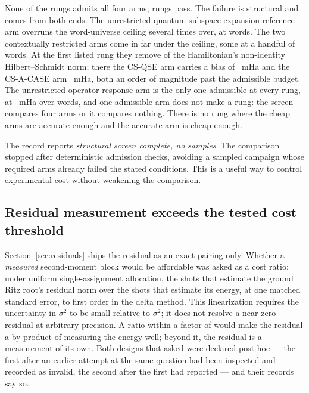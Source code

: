 \documentclass[aps,pra,reprint,superscriptaddress,nofootinbib,floatfix,
  showkeys]{revtex4-2}
\begin{document}
None of the \cqcRFourARungs{} rungs admits all four arms; \cqcRFourAPassing{}
rungs pass.  The failure is structural and comes from both ends.  The
unrestricted quantum-subspace-expansion reference arm overruns the
word-universe ceiling several times over, at \cqcRFourAFullWords{} words.  The
two contextually restricted arms come in far under the ceiling, some at a
handful of words.  At the first listed rung they remove
\cqcRFourARemovedFraction{} of the Hamiltonian's non-identity Hilbert--Schmidt
norm; there the CS-QSE arm carries a bias of \cqcRFourACSBias{}~mHa and the
CS-A-CASE arm \cqcRFourACSACaseBias{}~mHa, both an order of magnitude past the
admissible budget.  The unrestricted operator-response arm is the only one
admissible at every rung, at \cqcRFourAACaseBias{}~mHa over
\cqcRFourAACaseWords{} words, and one admissible arm does not make a rung: the
screen compares four arms or it compares nothing.  There is no rung where the
cheap arms are accurate enough and the accurate arm is cheap enough.

The record reports \emph{structural screen complete, no samples}. The
comparison stopped after deterministic admission checks, avoiding a sampled
campaign whose required arms already failed the stated conditions. This is a
useful way to control experimental cost without weakening the comparison.

\subsection{Residual measurement exceeds the tested cost threshold}
\label{sec:residual-closure}

Section~\ref{sec:residuals} ships the residual as an exact pairing only.
Whether a \emph{measured} second-moment block would be affordable was asked as a
cost ratio: under uniform single-assignment allocation, the shots that estimate
the ground Ritz root's residual norm over the shots that estimate its energy, at
one matched standard error, to first order in the delta method. This
linearization requires the uncertainty in $\sigma^2$ to be small relative to
$\sigma^2$; it does not resolve a near-zero residual at arbitrary precision.
A ratio within
a factor of \cqcResidualBar{} would make the residual a by-product of measuring
the energy well; beyond it, the residual is a measurement of its own.  Both
designs that asked were declared post hoc --- the first after an earlier attempt
at the same question had been inspected and recorded as invalid, the second
after the first had reported --- and their records say so.
\end{document}
